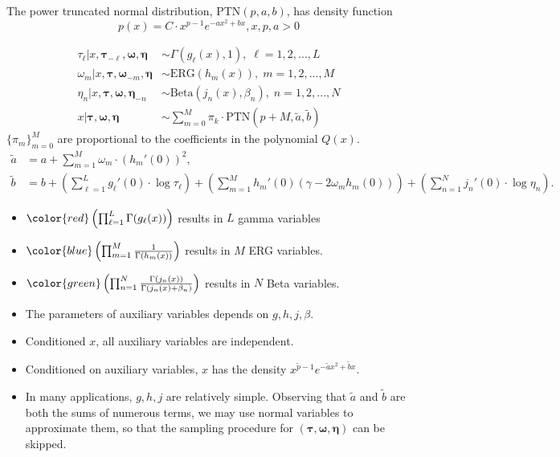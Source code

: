 \documentclass[10pt]{beamer}
\theoremstyle{remark}
\theoremstyle{definition}
\newcommand{\bcol}[1]{{\color{blue}{#1}}}
\begin{document}
\begin{frame}
\footnotesize
\begin{definition}
	The power truncated normal distribution, PTN$(p,a,b)$, has density function
	\begin{equation*}
	p(x) = C\cdot x^{p-1} e^{-ax^2+bx}, x,p,a>0
	\end{equation*}
\end{definition}
\bcol{\bf Gibbs Sampler:}
\begin{align*}
\tau_{\ell} | x, \bm{\tau}_{-\ell}, \bm{\omega,\eta} &\sim \Gamma(g_\ell(x),1), \; \ell = 1, 2, ..., L \\
\omega_m | x, \bm{\tau}, \bm{\omega}_{-m}, \bm{\eta} &\sim \text{ERG}(h_m(x)), \; m = 1, 2, ..., M\\
\eta_n | x, \bm{\tau}, \bm{\omega}, \bm{\eta}_{-n} &\sim \text{Beta}(j_n(x), \beta_n), \; n = 1, 2, ..., N\\
x | \bm{\tau}, \bm{\omega}, \bm{\eta} &\sim \sum_{m=0}^M \pi_k \cdot \text{PTN}(p+M, \tilde{a}, \tilde{b})
\end{align*}
$\{\pi_m\}_{m=0}^M$ are proportional to the coefficients in the polynomial $Q(x)$.
\begin{align*}
\tilde{a} &= a + \sum_{m=1}^M \omega_m\cdot(h_m'(0))^2,\\
\tilde{b} &= b + \left(\sum_{\ell=1}^{L} g_\ell'(0)\cdot\log\tau_{\ell}\right) + \left(\sum_{m=1}^M h_m'(0)(\gamma -2\omega_m h_m(0))\right) + \left(\sum_{n=1}^N j_n'(0)\cdot\log\eta_n\right). 
\end{align*}

\end{frame}

\begin{frame}
\begin{itemize}
	\item ${\color{red}\left(\prod_{\ell=1}^L \Gamma(g_\ell(x)) \right)}$ results in $L$ gamma variables
	\item ${\color{blue} \left(\prod_{m=1}^M \frac{1}{\Gamma(h_m(x))}\right)}$ results in $M$ ERG variables.
	\item ${\color{green}\left(\prod_{n=1}^N\frac{\Gamma(j_n(x))}{\Gamma(j_n(x) + \beta_n)}\right)}$ results in $N$ Beta variables. 
	\item The parameters of auxiliary variables depends on $g,h,j,\beta$.
	\item Conditioned $x$, all auxiliary variables are independent. 
	\item Conditioned on auxiliary variables, $x$ has the density $x^{\tilde{p}-1}e^{-\tilde{a}x^2 + \tilde{b} x}$. 
	\item In many applications, $g,h,j$ are relatively simple. Observing that $\tilde{a}$ and $\tilde{b}$ are both the sums of numerous terms, we may use normal variables to approximate them, so that the sampling procedure for $(\bm{\tau,\omega,\eta})$ can be skipped.
\end{itemize}
\end{frame}
\end{document}

